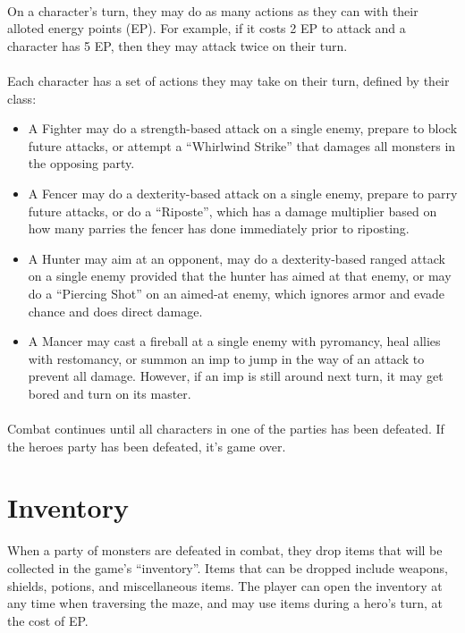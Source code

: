 \documentclass{article}
\begin{document}
\paragraph{}
On a character's turn, they may do as many actions as they can with their alloted energy points (EP). For example, if it costs 2 EP to attack and a character has 5 EP, then they may attack twice on their turn.

\paragraph{}
Each character has a set of actions they may take on their turn, defined by their class:
\begin{itemize}
\item A Fighter may do a strength-based attack on a single enemy, prepare to block future attacks, or attempt a ``Whirlwind Strike'' that damages all monsters in the opposing party.
\item A Fencer may do a dexterity-based attack on a single enemy, prepare to parry future attacks, or do a ``Riposte'', which has a damage multiplier based on how many parries the fencer has done immediately prior to riposting.
\item A Hunter may aim at an opponent, may do a dexterity-based ranged attack on a single enemy provided that the hunter has aimed at that enemy, or may do a  ``Piercing Shot'' on an aimed-at enemy, which ignores armor and evade chance and does direct damage.
\item A Mancer may cast a fireball at a single enemy with pyromancy, heal allies with restomancy, or summon an imp to jump in the way of an attack to prevent all damage. However, if an imp is still around next turn, it may get bored and turn on its master.
\end{itemize}

\paragraph{}
Combat continues until all characters in one of the parties has been defeated. If the heroes party has been defeated, it's game over.

\section{Inventory}
When a party of monsters are defeated in combat, they drop items that will be collected in the game's ``inventory''. Items that can be dropped include weapons, shields, potions, and miscellaneous items. The player can open the inventory at any time when traversing the maze, and may use items during a hero's turn, at the cost of EP.
\end{document}
